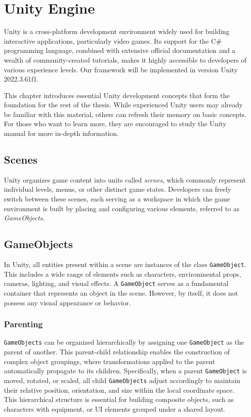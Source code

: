 \chapter{Unity Engine}
\label{chap:refs}
Unity is a cross-platform development environment widely used for building interactive applications, particularly video games. Its support for the C\# programming language, combined with extensive official documentation and a wealth of community-created tutorials, makes it highly accessible to developers of various experience levels. Our framework will be implemented in version Unity 2022.3.61f1. 

This chapter introduces essential Unity development concepts that form the foundation for the rest of the thesis. While experienced Unity users may already be familiar with this material, others can refresh their memory on basic concepts. For those who want to learn more, they are encouraged to study the Unity manual \cite{Unity-manual} for more in-depth information. 

\section{Scenes}
Unity organizes game content into units called \textit{scenes}, which commonly represent individual levels, menus, or other distinct game states. Developers can freely switch between these scenes, each serving as a workspace in which the game environment is built by placing and configuring various elements, referred to as \textit{GameObjects}. 

\section{GameObjects}
In Unity, all entities present within a scene are instances of the class \verb|GameObject|. This includes a wide range of elements such as characters, environmental props, cameras, lighting, and visual effects. A \verb|GameObject| serves as a fundamental container that represents an object in the scene. However, by itself, it does not possess any visual appearance or behavior.

\subsection{Parenting}
\verb|GameObjects| can be organized hierarchically by assigning one \verb|GameObject| as the parent of another. This parent-child relationship enables the construction of complex object groupings, where transformations applied to the parent automatically propagate to its children. Specifically, when a parent \verb|GameObject| is moved, rotated, or scaled, all child \verb|GameObjects| adjust accordingly to maintain their relative position, orientation, and size within the local coordinate space. This hierarchical structure is essential for building composite objects, such as characters with equipment, or UI elements grouped under a shared layout. 

